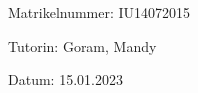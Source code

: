 \begin{large} 
\begin{center}
Matrikelnummer: IU14072015
\end{center}
\end{large} 

\vspace*{-6mm}

\begin{large} 
\begin{center}
Tutorin: Goram, Mandy
\end{center}
\end{large} 

\vspace*{-6mm}

\begin{large} 
\begin{center}
Datum: 15.01.2023
\end{center}
\end{large} 


\pagestyle{empty} %

